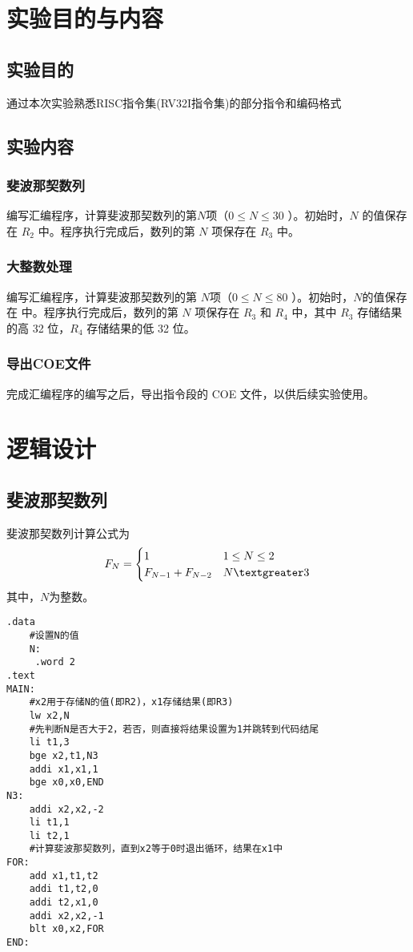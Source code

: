 \documentclass[12pt,a4paper]{ctexart}
\begin{document}
\section{实验目的与内容}
\subsection{实验目的}
通过本次实验熟悉RISC指令集(RV32I指令集)的部分指令和编码格式
\subsection{实验内容}
\subsubsection{斐波那契数列}
编写汇编程序，计算斐波那契数列的第$N$项（$0 \leq N \leq 30 $
）。初始时，$N$ 的值保存在 $R_{2}$
 中。程序执行完成后，数列的第 $N$
 项保存在 $R_{3}$ 中。
\subsubsection{大整数处理}
编写汇编程序，计算斐波那契数列的第 $N$项（$0 \leq N \leq 80 $
）。初始时，$N$的值保存在  中。程序执行完成后，数列的第 $N$
 项保存在 $R_{3}$ 和 $R_{4}$ 中，其中 $R_{3}$
 存储结果的高 32 位，$R_{4}$ 存储结果的低 32 位。
\subsubsection{导出COE文件}
完成汇编程序的编写之后，导出指令段的 COE 文件，以供后续实验使用。

\section{逻辑设计}
\subsection{斐波那契数列}
斐波那契数列计算公式为
$$
F_N=
\begin{cases}
    1&1\leq N \leq 2\\
    F_{N-1}+F_{N-2}&N \textgreater 3
\end{cases}
$$
其中，$N$为整数。
\begin{lstlisting}[caption={斐波那契数列}]
.data
    #设置N的值
    N:
     .word 2
.text
MAIN:
    #x2用于存储N的值(即R2)，x1存储结果(即R3)
    lw x2,N
    #先判断N是否大于2，若否，则直接将结果设置为1并跳转到代码结尾
    li t1,3
    bge x2,t1,N3
    addi x1,x1,1
    bge x0,x0,END
N3:
    addi x2,x2,-2
    li t1,1
    li t2,1
    #计算斐波那契数列，直到x2等于0时退出循环，结果在x1中
FOR:
    add x1,t1,t2
    addi t1,t2,0
    addi t2,x1,0
    addi x2,x2,-1
    blt x0,x2,FOR
END:
\end{lstlisting}
\end{document}
